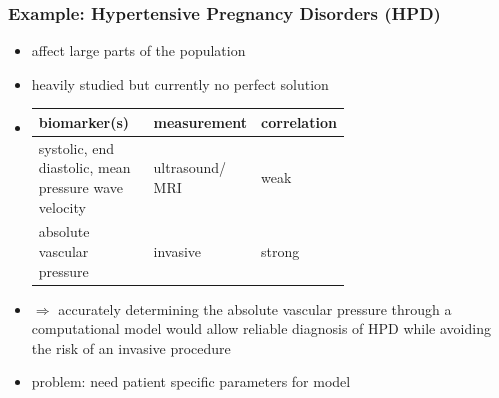 \documentclass{beamer}
\begin{document}
\begin{frame}
	\frametitle{Example: Hypertensive Pregnancy Disorders (HPD)}
	\begin{itemize}
		\item affect large parts of the population
		\item heavily studied but currently no perfect solution 
		\item \begin{tabularx}{\linewidth}{| >{\centering\arraybackslash}m{0.4\linewidth} | >{\centering\arraybackslash}m{0.25\linewidth} | >{\centering\arraybackslash}X |} 
				\hline
				biomarker(s) & measurement & correlation \\ 
				\hline
				\hline
				systolic, end diastolic, mean pressure wave velocity & ultrasound/ MRI & weak \\ 
				\hline
				absolute vascular pressure & invasive & strong \\ 
				\hline
			\end{tabularx}
		\item
			$\Rightarrow$ accurately determining the absolute vascular pressure through a computational model would allow reliable diagnosis of HPD while avoiding the risk of an invasive procedure
		\item problem: need patient specific parameters for model
	\end{itemize}
\end{frame}
\end{document}
